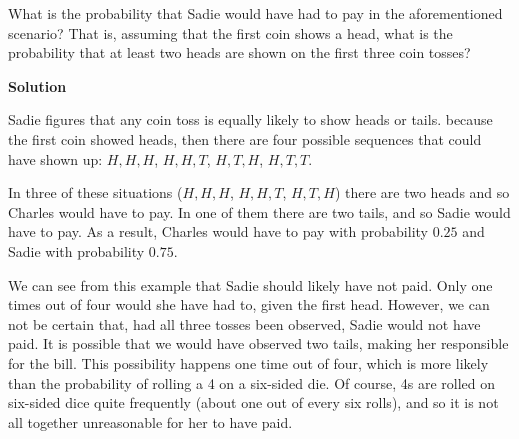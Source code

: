 \documentclass[
  letterpaper,
  DIV=11,
  numbers=noendperiod]{scrreprt}
\begin{document}
\begin{tcolorbox}[enhanced jigsaw, toptitle=1mm, arc=.35mm, title={{\faIcon{question-circle}} Example: Basic Probability Enumeration}, opacitybacktitle=0.6, colbacktitle=quarto-callout-tip-color!10!white, coltitle=black, breakable, bottomrule=.15mm, opacityback=0, colframe=quarto-callout-tip-color-frame, bottomtitle=1mm, titlerule=0mm, rightrule=.15mm, toprule=.15mm, left=2mm, leftrule=.75mm, colback=white]

{What is the probability that Sadie would have had to pay in the
aforementioned scenario? That is, assuming that the first coin shows a
head, what is the probability that at least two heads are shown on the
first three coin tosses?}

\begin{tcolorbox}[enhanced jigsaw, toprule=.15mm, breakable, bottomrule=.15mm, arc=.35mm, opacityback=0, colback=white, rightrule=.15mm, left=2mm, leftrule=.75mm]

\vspace{-3mm}\textbf{Solution}\vspace{3mm}

Sadie figures that any coin toss is equally likely to show heads or
tails. because the first coin showed heads, then there are four possible
sequences that could have shown up: \(H,H,H\), \(H,H,T\), \(H,T,H\),
\(H,T,T\).

In three of these situations (\(H,H,H\), \(H,H,T\), \(H,T,H\)) there are
two heads and so Charles would have to pay. In one of them there are two
tails, and so Sadie would have to pay. As a result, Charles would have
to pay with probability \(0.25\) and Sadie with probability \(0.75\).

\end{tcolorbox}

\end{tcolorbox}

We can see from this example that Sadie should likely have not paid.
Only one times out of four would she have had to, given the first head.
However, we can not be certain that, had all three tosses been observed,
Sadie would not have paid. It is possible that we would have observed
two tails, making her responsible for the bill. This possibility happens
one time out of four, which is more likely than the probability of
rolling a 4 on a six-sided die. Of course, 4s are rolled on six-sided
dice quite frequently (about one out of every six rolls), and so it is
not all together unreasonable for her to have paid.
\end{document}
